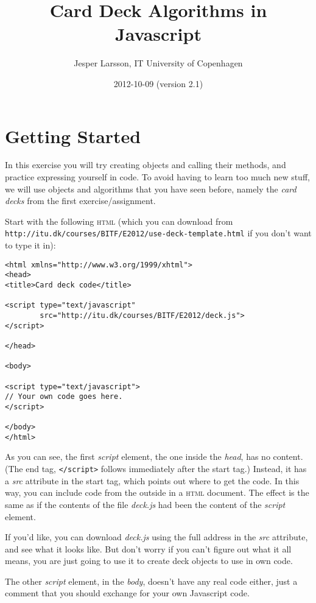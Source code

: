 \documentclass[a4paper,twoside]{tufte-handout}
\title{Card Deck Algorithms in Javascript}
\author{Jesper Larsson, IT University of Copenhagen}
\date{2012-10-09 (version 2.1)}
\begin{document}
\maketitle

\section{Getting Started}\label{sec-start}

In this exercise you will try creating objects and calling their
methods, and practice expressing yourself in code. To avoid having to learn
too much new stuff, we will use objects and algorithms that you have
seen before, namely the \emph{card decks} from the first
exercise/assignment.

Start with the following \textsc{html} (which you can download from
\verb'http://itu.dk/courses/BITF/E2012/use-deck-template.html' if you
don't want to type it in):
\begin{lstlisting}
<html xmlns="http://www.w3.org/1999/xhtml">
<head>
<title>Card deck code</title>

<script type="text/javascript"
        src="http://itu.dk/courses/BITF/E2012/deck.js">
</script>

</head>

<body>

<script type="text/javascript">
// Your own code goes here.
</script>

</body>
</html>
\end{lstlisting}

As you can see, the first \emph{script} element, the one inside the
\emph{head}, has no content. (The end tag, \verb'</script>' follows
immediately after the start tag.) Instead, it has a \emph{src}
attribute in the start tag, which points out where to get the code. In
this way, you can include code from the outside in a \textsc{html}
document. The effect is the same as if the contents of the file
\emph{deck.js} had been the content of the \emph{script} element.

If you'd like, you can download \emph{deck.js} using the full address
in the \emph{src} attribute, and see what it looks like. But don't
worry if you can't figure out what it all means, you are just going to
use it to create deck objects to use in own code.

The other \emph{script} element, in the \emph{body}, doesn't have any
real code either, just a comment that you should exchange for your own
Javascript code.
\end{document}
